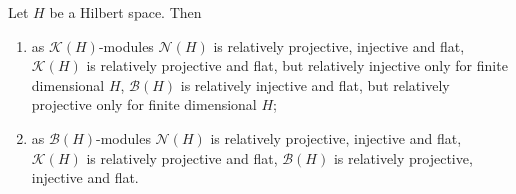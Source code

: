 \begin{proposition}\label{KHAndBHModsRelTh} Let $H$ be a Hilbert space. Then
\begin{enumerate}[label = (\roman*)]
    \item as $\mathcal{K}(H)$-modules $\mathcal{N}(H)$ is relatively projective,
    injective and flat, $\mathcal{K}(H)$ is relatively projective and flat, but
    relatively injective only for finite dimensional $H$, $\mathcal{B}(H)$ is
    relatively injective and flat, but relatively projective only for finite
    dimensional $H$;

    \item as $\mathcal{B}(H)$-modules $\mathcal{N}(H)$ is relatively projective,
    injective and flat, $\mathcal{K}(H)$ is relatively projective and flat,
    $\mathcal{B}(H)$ is relatively projective, injective and flat.
\end{enumerate}
\end{proposition}
